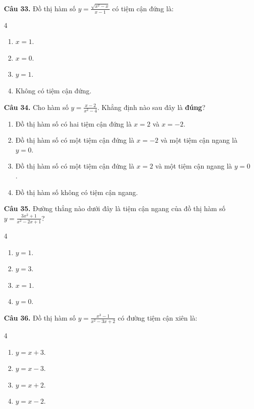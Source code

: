 \documentclass[12pt]{article}
\begin{document}
	\vspace{0.4cm}
	\noindent \textbf{Câu 33.} Đồ thị hàm số $y = \frac{\sqrt{x^2 - x}}{x - 1}$ có tiệm cận đứng là:
	\begin{multicols}{4}
		\begin{enumerate}[label=\textbf{\Alph*.}]
			\item $x = 1$.
			\item $x = 0$.
			\item $y = 1$.
			\item Không có tiệm cận đứng.
		\end{enumerate}
	\end{multicols}
	
	\vspace{0.4cm}
	\noindent \textbf{Câu 34.} Cho hàm số $y = \frac{x - 2}{x^2 - 4}$. Khẳng định nào sau đây là \textbf{đúng}?
	\begin{enumerate}[label=\textbf{\Alph*.}]
		\item Đồ thị hàm số có hai tiệm cận đứng là $x = 2$ và $x = -2$.
		\item Đồ thị hàm số có một tiệm cận đứng là $x = -2$ và một tiệm cận ngang là $y = 0$.
		\item Đồ thị hàm số có một tiệm cận đứng là $x = 2$ và một tiệm cận ngang là $y = 0$.
		\item Đồ thị hàm số không có tiệm cận ngang.
	\end{enumerate}
	
	\vspace{0.4cm}
	\noindent \textbf{Câu 35.} Đường thẳng nào dưới đây là tiệm cận ngang của đồ thị hàm số $y = \frac{3x^2 + 1}{x^2 - 2x + 1}$?
	\begin{multicols}{4}
		\begin{enumerate}[label=\textbf{\Alph*.}]
			\item $y = 1$.
			\item $y = 3$.
			\item $x = 1$.
			\item $y = 0$.
		\end{enumerate}
	\end{multicols}
	
	\vspace{0.4cm}
	\noindent \textbf{Câu 36.} Đồ thị hàm số $y = \frac{x^3 - 1}{x^2 - 3x + 2}$ có đường tiệm cận xiên là:
	\begin{multicols}{4}
		\begin{enumerate}[label=\textbf{\Alph*.}]
			\item $y = x + 3$.
			\item $y = x - 3$.
			\item $y = x + 2$.
			\item $y = x - 2$.
		\end{enumerate}
	\end{multicols}
	
\end{document}
